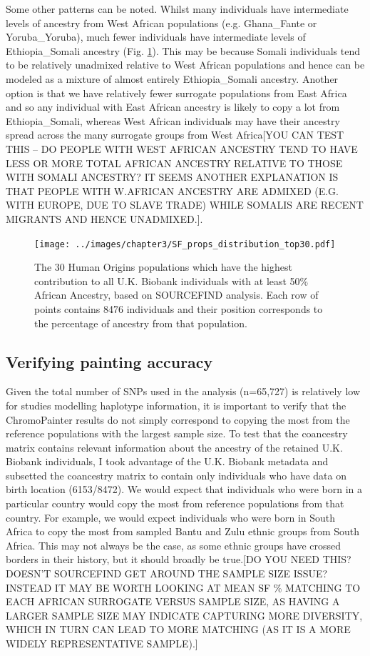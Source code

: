 Some other patterns can be noted. Whilst many individuals have intermediate levels of ancestry from West African populations (e.g. Ghana\_Fante or Yoruba\_Yoruba), much fewer individuals have intermediate levels of Ethiopia\_Somali ancestry (Fig. \ref{fig:SF_props_distribution_top30}). This may be because Somali individuals tend to be relatively unadmixed relative to West African populations and hence can be modeled as a mixture of almost entirely Ethiopia\_Somali ancestry. Another option is that we have relatively fewer surrogate populations from East Africa and so any individual with East African ancestry is likely to copy a lot from Ethiopia\_Somali, whereas West African individuals may have their ancestry spread across the many surrogate groups from West Africa{\color{red}[YOU CAN TEST THIS -- DO PEOPLE WITH WEST AFRICAN ANCESTRY TEND TO HAVE LESS OR MORE TOTAL AFRICAN ANCESTRY RELATIVE TO THOSE WITH SOMALI ANCESTRY? IT SEEMS ANOTHER EXPLANATION IS THAT PEOPLE WITH W.AFRICAN ANCESTRY ARE ADMIXED (E.G. WITH EUROPE, DUE TO SLAVE TRADE) WHILE SOMALIS ARE RECENT MIGRANTS AND HENCE UNADMIXED.]}. 

\begin{figure}[htp]
    \centering
    \texttt{[image: ../images/chapter3/SF\_props\_distribution\_top30.pdf]}
    \caption{The 30 Human Origins populations which have the highest contribution to all U.K. Biobank individuals with at least 50\% African Ancestry, based on SOURCEFIND analysis. Each row of points contains 8476 individuals and their position corresponds to the percentage of ancestry from that population. }
    \label{fig:SF_props_distribution_top30}
\end{figure}

\subsection{Verifying painting accuracy}

Given the total number of SNPs used in the analysis (n=65,727) is {\color{red}relatively low for studies modelling haplotype information}, it is important to verify that the ChromoPainter results do not simply correspond to copying the most from the reference populations with the largest sample size. To test that the coancestry matrix contains relevant information about the ancestry of the retained U.K. Biobank individuals, I took advantage of the U.K. Biobank metadata and subsetted the coancestry matrix to contain only individuals who have data on birth location (6153/8472). We would expect that individuals who were born in a particular country would copy the most from reference populations from that country. For example, we would expect individuals who were born in South Africa to copy the most from sampled Bantu and Zulu ethnic groups from South Africa. This may not always be the case, as some ethnic groups have crossed borders in their history, but it should broadly be true.{\color{red}[DO YOU NEED THIS? DOESN'T SOURCEFIND GET AROUND THE SAMPLE SIZE ISSUE? INSTEAD IT MAY BE WORTH LOOKING AT MEAN SF \% MATCHING TO EACH AFRICAN SURROGATE VERSUS SAMPLE SIZE, AS HAVING A LARGER SAMPLE SIZE MAY INDICATE CAPTURING MORE DIVERSITY, WHICH IN TURN CAN LEAD TO MORE MATCHING (AS IT IS A MORE WIDELY REPRESENTATIVE SAMPLE).]}

